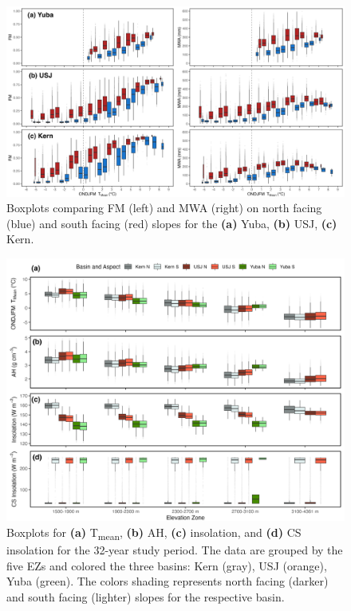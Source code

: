 \begin{figure}[t]
\centering
\includegraphics[width=\textwidth]{figures/ch2_figs/aspect_temp_mwa_fum_full_boxplots_v2.png}
\caption{Boxplots comparing FM (left) and MWA (right) on north facing (blue) and south facing (red) slopes for the \textbf{(a)} Yuba, \textbf{(b)} USJ, \textbf{(c)} Kern.}
\label{fig:aspec_mwa_fm_bp}
\end{figure}

\begin{figure}[h]
\centering
\includegraphics[width=\textwidth]{figures/ch2_figs/met4_boxplot_v4.png}
\caption{ Boxplots for \textbf{(a)} T\textsubscript{mean}, \textbf{(b)} AH, \textbf{(c)} insolation, and \textbf{(d)} CS insolation for the 32-year study period. The data are grouped by the five EZs and colored the three basins: Kern (gray), USJ (orange), Yuba (green). The colors shading represents north facing (darker) and south facing (lighter) slopes for the respective basin.}
\label{fig:met_boxplots}
\end{figure}



